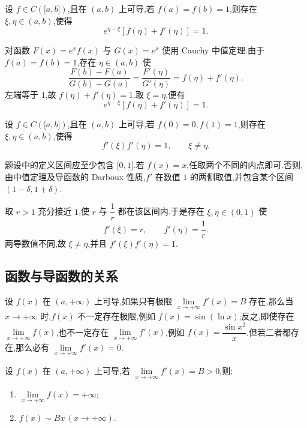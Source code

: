 \begin{example}
    设 $f\in C(\lbrack a,b\rbrack)$,且在 $(a,b)$ 上可导,若 $f(a)=f(b)=1$,则存在 $\xi,\eta\in(a,b)$,使得
    \[
        e^{\eta-\xi}[f(\eta)+f'(\eta)]=1.
    \]
\end{example}
\exampleblank

\begin{solution}
    对函数 $F(x)=e^x f(x)$ 与 $G(x)=e^x$ 使用 Cauchy 中值定理.由于 $f(a)=f(b)=1$,存在 $\eta\in(a,b)$ 使
    \[
        \dfrac{F(b)-F(a)}{G(b)-G(a)}
        =\dfrac{F'(\eta)}{G'(\eta)}
        =f(\eta)+f'(\eta).
    \]
    左端等于 $1$,故 $f(\eta)+f'(\eta)=1$.取 $\xi=\eta$,便有
    \[
        e^{\eta-\xi}[f(\eta)+f'(\eta)]=1.
    \]
\end{solution}

\begin{example}
    设 $f\in C(\lbrack a,b\rbrack)$,且在 $(a,b)$ 上可导,若 $f(0)=0,f(1)=1$,则存在 $\xi,\eta\in(a,b)$,使得
    \[
        f'(\xi)f'(\eta)=1,
        \qquad \xi\neq\eta.
    \]
\end{example}
\exampleblank

\begin{solution}
    题设中的定义区间应至少包含 $\lbrack0,1\rbrack$.若 $f(x)=x$,任取两个不同的内点即可.否则,由中值定理及导函数的 Darboux 性质,$f'$ 在数值 $1$ 的两侧取值,并包含某个区间 $(1-\delta,1+\delta)$.

    取 $r>1$ 充分接近 $1$,使 $r$ 与 $\dfrac{1}{r}$ 都在该区间内.于是存在 $\xi,\eta\in(0,1)$ 使
    \[
        f'(\xi)=r,
        \qquad
        f'(\eta)=\dfrac{1}{r}.
    \]
    两导数值不同,故 $\xi\neq\eta$,并且 $f'(\xi)f'(\eta)=1$.
\end{solution}



\subsection{函数与导函数的关系}

设 $f(x)$ 在 $(a,+\infty)$ 上可导,如果只有极限 $\displaystyle\lim\limits_{x\to+\infty}f'(x)=B$ 存在,那么当 $x\to+\infty$ 时,$f(x)$ 不一定存在极限,例如 $f(x)=\sin(\ln x)$;反之,即使存在 $\displaystyle\lim\limits_{x\to+\infty}f(x)$,也不一定存在 $\displaystyle\lim\limits_{x\to+\infty}f'(x)$,例如 $f(x)=\dfrac{\sin x^2}{x}$.但若二者都存在,那么必有 $\displaystyle\lim\limits_{x\to+\infty}f'(x)=0$.

\begin{example}
    设 $f(x)$ 在 $(a,+\infty)$ 上可导,若 $\displaystyle\lim\limits_{x\to+\infty}f'(x)=B>0$,则:
    \begin{enumerate}
        \item $\displaystyle\lim\limits_{x\to+\infty}f(x)=+\infty$;
        \item $f(x)\sim Bx\,(x\to+\infty)$.
    \end{enumerate}
\end{example}
\exampleblank


